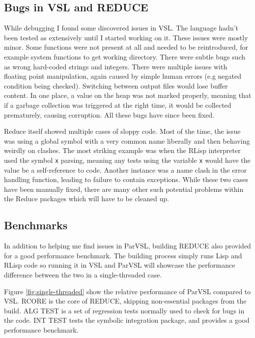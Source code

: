 \subsection{Bugs in VSL and REDUCE}

While debugging I found some discovered issues in VSL. The language hadn't been tested
as extensively until I started working on it. These issues were mostly minor. Some functions
were not present at all and needed to be reintroduced, for example system functions to get
working directory. There were subtle bugs such as wrong
hard-coded strings and integers. There were multiple issues with floating point manipulation,
again caused by simple human errors (e.g negated condition being checked). Switching between
output files would lose buffer content. In one place, a value on the heap was not marked
properly, meaning that if a garbage collection was triggered at the right time, it would
be collected prematurely, causing corruption. All these bugs have since been fixed.

Reduce itself showed multiple cases of sloppy code. Most of the time, the issue was using
a global symbol with a very common name liberally and then behaving weirdly
on clashes. The most striking example was when the RLisp interpreter used the symbol \texttt{x}
parsing, meaning any tests using the variable \texttt{x} would have the value be a self-reference
to code. Another instance was a name clash in the error handling function, leading to failure
to contain exceptions. While these two cases have been manually fixed, there are many other
such potential problems within the Reduce packages which will have to be cleaned up.


\subsection{Benchmarks}

In addition to helping me find issues in ParVSL, building REDUCE also provided for a
good performance benchmark. The building process simply runs Lisp and RLisp code so
running it in VSL and ParVSL will showcase the performance difference between the
two in a single-threaded case.

Figure \ref{fig:single-threaded} show the relative performance of ParVSL compared to VSL.
RCORE is the core of REDUCE, skipping non-essential packages from the build. ALG TEST is
a set of regression tests normally used to check for bugs in the code. INT TEST tests the
symbolic integration package, and provides a good performance benchmark.

